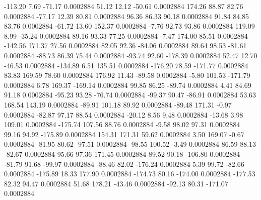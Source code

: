      -113.20        7.69      -71.17     0.0002884
       51.12       12.12      -50.61     0.0002884
      174.26       88.87       82.76     0.0002884
      -77.17       12.39       80.81     0.0002884
       96.36       86.33       90.18     0.0002884
       91.84       84.85       83.76     0.0002884
      -61.72       13.60      152.37     0.0002884
       -7.76       92.73       93.86     0.0002884
      119.09        8.99      -35.24     0.0002884
       89.16       93.33       77.25     0.0002884
       -7.47      174.00       85.51     0.0002884
     -142.56      171.37       27.56     0.0002884
       82.05       92.36      -84.06     0.0002884
       89.64       98.53      -81.61     0.0002884
      -88.73       86.39       75.44     0.0002884
      -93.74       92.60     -178.39     0.0002884
       52.47       12.70      -46.53     0.0002884
     -134.89        6.51      135.51     0.0002884
     -176.20       78.59     -171.77     0.0002884
       83.83      169.59       78.60     0.0002884
      176.92       11.43      -89.58     0.0002884
       -5.80      101.53     -171.79     0.0002884
        6.78      169.37     -169.14     0.0002884
       99.85       86.25      -89.74     0.0002884
        4.41       84.69       91.18     0.0002884
      -95.23       93.28      -76.74     0.0002884
      -99.37       90.47      -86.91     0.0002884
       53.63      168.54      143.19     0.0002884
      -89.91      101.18       89.92     0.0002884
      -89.48      171.31       -0.97     0.0002884
      -82.87       97.17       88.54     0.0002884
      -20.12        8.56        9.48     0.0002884
      -13.68        3.98      109.01     0.0002884
     -175.74      107.56       88.76     0.0002884
       -9.58       98.02       97.31     0.0002884
       99.16       94.92     -175.89     0.0002884
      154.31      171.31       59.62     0.0002884
        3.50      169.07       -0.67     0.0002884
      -81.95       80.62      -97.51     0.0002884
      -98.55      100.52       -3.49     0.0002884
       86.59       88.13      -82.67     0.0002884
       95.66       97.36      171.45     0.0002884
       89.52       90.18     -106.80     0.0002884
      -81.79       91.68      -99.97     0.0002884
      -88.46       82.02     -176.24     0.0002884
        5.39       99.72      -82.66     0.0002884
     -175.89       18.33      177.90     0.0002884
     -174.73       80.16     -174.00     0.0002884
     -177.53       82.32       94.47     0.0002884
       51.68      178.21      -43.46     0.0002884
      -92.13       80.31     -171.07     0.0002884
